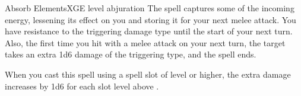 \begin{spell}{Absorb Elements}{XGE}{ level abjuration}
{
}
The spell captures some of the incoming energy, lessening
its effect on you and storing it for your next melee
attack. You have resistance to the triggering damage
type until the start of your next turn. Also, the first time
you hit with a melee attack on your next turn, the target
takes an extra 1d6 damage of the triggering type, and
the spell ends.

 When you cast this spell using a
spell slot of  level or higher, the extra damage increases
by 1d6 for each slot level above .
\end{spell}
